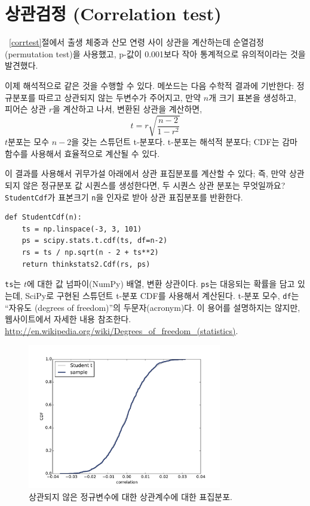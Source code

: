 \section{상관검정 (Correlation test)}

~\ref{corrtest}절에서 출생 체중과 산모 연령 사이 상관을 계산하는데 순열검정(permutation test)을 사용했고, p-값이 0.001보다 작아 통계적으로 유의적이라는 것을 발견했다.

이제 해석적으로 같은 것을 수행할 수 있다.
메쏘드는 다음 수학적 결과에 기반한다: 정규분포를 따르고 상관되지 않는 두변수가 주어지고, 만약 $n$개 크기 표본을 생성하고, 피어슨 상관 $r$을 계산하고 나서, 변환된 상관을 계산하면, 
%
\[ t = r \sqrt{\frac{n-2}{1-r^2}} \]
%
$t$분포는 모수 $n-2$을 갖는 스튜던트 t-분포다.
t-분포는 해석적 분포다; CDF는 감마 함수를 사용해서 효율적으로 계산될 수 있다.

이 결과를 사용해서 귀무가설 아래에서 상관 표집분포를 계산할 수 있다; 즉, 만약 상관되지 않은 정규분포 값 시퀀스를 생성한다면, 두 시퀀스 상관 분포는 무엇일까요? {\tt StudentCdf}가 표본크기 {\tt n}을 인자로 받아 상관 표집분포를 반환한다.

\begin{verbatim}
def StudentCdf(n):
    ts = np.linspace(-3, 3, 101)
    ps = scipy.stats.t.cdf(ts, df=n-2)
    rs = ts / np.sqrt(n - 2 + ts**2)
    return thinkstats2.Cdf(rs, ps)
\end{verbatim}

{\tt ts}는 $t$에 대한 값 넘파이(NumPy) 배열, 변환 상관이다.
{\tt ps}는 대응되는 확률을 담고 있는데, SciPy로 구현된 스튜던트 t-분포 CDF를 사용해서 계산된다. t-분포 모수, {\tt df}는 ``자유도 (degrees of freedom)''의 두문자(acronym)다. 이 용어를 설명하지는 않지만, 웹사이트에서 자세한 내용 참조한다. \url{http://en.wikipedia.org/wiki/Degrees_of_freedom_(statistics)}.

\begin{figure}
\centerline{\includegraphics[height=2.5in]{figs/normal4.pdf}}
\caption{상관되지 않은 정규변수에 대한 상관계수에 대한 표집분포.}
\label{normal4}
\end{figure}

